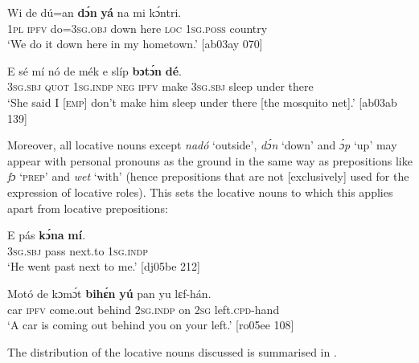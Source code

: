 \ea%
    \label{ex:key:931}
    \gll Wi  de  dú=an    \textbf{dɔ́n}    \textbf{yá}   na  mi    kɔ́ntri.\\
\textsc{1pl}  \textsc{ipfv}  do=\textsc{3sg.obj}  down  here    \textsc{loc}  \textsc{1sg.poss}  country\\

\glt ‘We do it down here in my hometown.’ [ab03ay 070]
\z


\ea%
    \label{ex:key:932}
    \gll E    sé    mí    nó  de  mék    e    slíp    \textbf{bɔtɔ́n}  \textbf{dé}.\\
\textsc{3sg.sbj}  \textsc{quot}    \textsc{1sg.indp}  \textsc{neg}  \textsc{ipfv}  make  \textsc{3sg.sbj}  sleep  under  there\\

\glt ‘She said I [\textsc{emp}] don’t make him sleep under there [the mosquito net].’ [ab03ab 139]
\z

Moreover, all locative nouns except \textit{nadó} ‘outside’, \textit{dɔ́n} ‘down’ and \textit{ɔ́p} ‘up’ may appear with personal pronouns as the ground in the same way as prepositions like \textit{fɔ} ‘\textsc{prep’} and \textit{wet} ‘with’ (hence prepositions that are not [exclusively] used for the expression of locative roles). This sets the locative nouns to which this applies apart from locative prepositions: 


\ea%
    \label{ex:key:933}
    \gll E    pás    \textbf{kɔ́na}  \textbf{mí}.\\
\textsc{3sg.sbj}  pass    next.to  \textsc{1sg.indp}\\

\glt ‘He went past next to me.’ [dj05be 212]
\z


\ea%
    \label{ex:key:934}
    \gll Motó  de  kɔmɔ́t    \textbf{bihɛ́n}  \textbf{yú}    pan  yu  lɛf-hán.\\
car    \textsc{ipfv}  come.out  behind  \textsc{2sg.indp}  on  \textsc{2sg}  left.\textsc{cpd}{}-hand\\

\glt ‘A car is coming out behind you on your left.’ [ro05ee 108]
\z

The distribution of the locative nouns discussed is summarised in .

